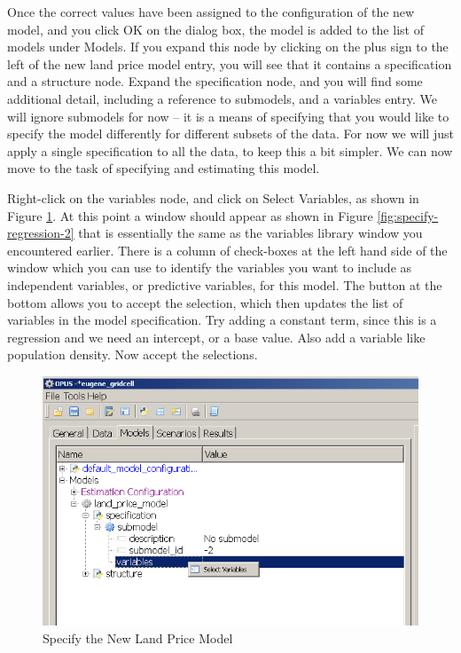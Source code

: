 Once the correct values have been assigned to the configuration of the new model, and you click OK on the dialog box, the model is added to the list of models under Models.  If you expand this node by clicking on the plus sign to the left of the new land price model entry, you will see that it contains a specification and a structure node.  Expand the specification node, and you will find some additional detail, including a reference to submodels, and a variables entry.  We will ignore submodels for now -- it is a means of specifying that you would like to specify the model differently for different subsets of the data.  For now we will just apply a single specification to all the data, to keep this a bit simpler.  We can now move to the task of specifying and estimating this model. 

Right-click on the variables node, and click on Select Variables, as shown in Figure \ref{fig:specify-regression-1}.  At this point a window should appear as shown in Figure \ref{fig:specify-regression-2} that is essentially the same as the variables library window you encountered earlier.  There is a column of check-boxes at the left hand side of the window which you can use to identify the variables you want to include as independent variables, or predictive variables, for this model.  The button at the bottom allows you to accept the selection, which then updates the list of variables in the model specification.  Try adding a constant term, since this is a regression and we need an intercept, or a base value.  Also add a variable like population density.  Now accept the selections.


\begin{figure}[htp]
\begin{center}
\includegraphics[scale=0.6]{part-gui/images/model-manager-specify-regression-model-1.png}
\end{center}
\caption{Specify the New Land Price Model}
\label{fig:specify-regression-1}
\end{figure}

